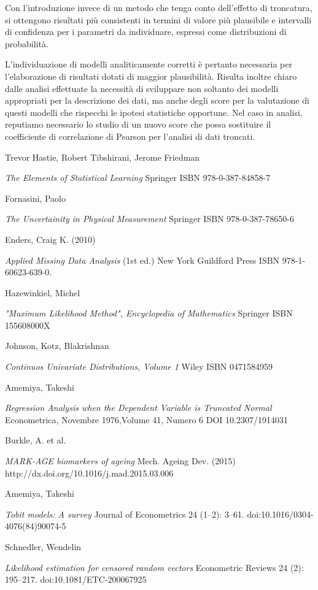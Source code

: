 \documentclass[12pt,openright,twoside,a4paper]{book}
\begin{document}
Con l'introduzione invece di un metodo che tenga conto dell'effetto di troncatura, si ottengono risultati più consistenti in termini di valore più plausibile e intervalli di confidenza per i parametri da individuare, espressi come distribuzioni di probabilità.

L'individuazione di modelli analiticamente corretti è pertanto necessaria per l'elaborazione di risultati dotati di maggior plausibilità.
Risulta inoltre chiaro dalle analisi effettuate la necessità di sviluppare non soltanto dei modelli appropriati per la descrizione dei dati, ma anche degli score per la valutazione di questi modelli che rispecchi le ipotesi statistiche opportune.
Nel caso in analisi, reputiamo necessario lo studio di un nuovo score che possa sostituire il coefficiente di correlazione di Pearson per l'analisi di dati troncati.

\backmatter
\begin{thebibliography}{99}
Trevor Hastie, Robert Tibshirani, Jerome Friedman

\emph{The Elements of Statistical Learning}
Springer ISBN 978-0-387-84858-7

Fornasini, Paolo

\emph{The Uncertainity in Physical Measurement}
Springer ISBN 978-0-387-78650-6

Enders, Craig K. (2010)

\emph{Applied Missing Data Analysis } (1st ed.)
 New York
 Guildford Press ISBN 978-1-60623-639-0.

Hazewinkiel, Michel

\emph{"Maximum Likelihood Method", Encyclopedia of Mathematics}
Springer ISBN 155608000X

Johnson, Kotz, Blakrishnan

\emph{Continuos Univariate Distributions, Volume 1}
Wiley ISBN 0471584959

Amemiya, Takeshi

\emph{Regression Analysis when the Dependent Variable is Truncated Normal}
Econometrica, Novembre 1976,Volume 41, Numero 6  DOI 10.2307/1914031

Burkle, A. et al.

\emph{MARK-AGE biomarkers of ageing}
Mech. Ageing Dev. (2015) http://dx.doi.org/10.1016/j.mad.2015.03.006

Amemiya, Takeshi

\emph{Tobit models: A survey}
 Journal of Econometrics 24 (1–2): 3–61. doi:10.1016/0304-4076(84)90074-5

Schnedler, Wendelin

\emph{Likelihood estimation for censored random vectors}
Econometric Reviews 24 (2): 195–217. doi:10.1081/ETC-200067925

\end{thebibliography}
\end{document}
